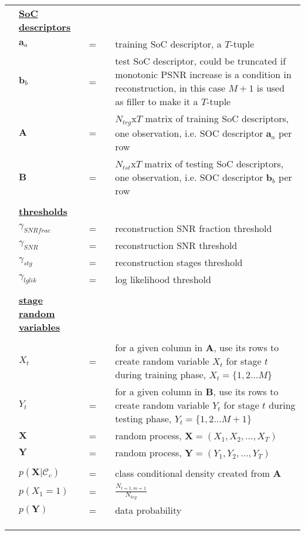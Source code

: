 \documentclass{article}
\begin{document}
\begin{longtable}{llllp{3in}}
&\textbf{\underline{SoC descriptors}}&&&																															\\
&$\mathbf{a}_a$  		&=&&  training SoC descriptor, a $T$-tuple 																																	\\
&$\mathbf{b}_b$ 			&=&&  test SoC descriptor, could be truncated if monotonic PSNR increase is a condition in reconstruction, in this case $M+1$ is used as filler to make it a $T$-tuple	\\
&$\mathbf{A}$  			&=&&  $N_{trg}$x$T$ matrix of training SoC descriptors, one observation, i.e. SOC descriptor $\mathbf{a}_a$ per row 													\\
&$\mathbf{B}$  			&=&&  $N_{tst}$x$T$ matrix of testing SoC descriptors, one observation, i.e. SOC descriptor $\mathbf{b}_b$ per row 													\\ \\

&\textbf{\underline{thresholds}}&&&																															\\
&$\gamma_{SNRfrac}$  		&=&&  reconstruction SNR fraction threshold 																																	\\
&$\gamma_{SNR}$  		&=&&  reconstruction SNR threshold 																																	\\
&$\gamma_{stg}$  		&=&&  reconstruction stages threshold 																																	\\
&$\gamma_{lglik}$  		&=&&  log likelihood threshold 																																	\\ \\

&\textbf{\underline{stage random variables}}&&&\\																															\\
&$X_t$ 					&=&& for a given column in $\mathbf{A}$, use its rows to create random variable $X_t$ for stage $t$ during training phase, $X_t = \{1,2 \ldots M \}$ 					\\
&$Y_t$ 					&=&& for a given column in $\mathbf{B}$, use its rows to create random variable $Y_t$ for stage $t$ during testing phase, $Y_t = \{1,2 \ldots M+1 \}$ 				\\
&$\mathbf{X}$  			&=&& random process, $\mathbf{X} = (X_1, X_2, \ldots, X_T)$																												\\
&$\mathbf{Y}$  			&=&& random process, $\mathbf{Y} = (Y_1, Y_2, \ldots, Y_T)$																												\\ \\
&$p(\mathbf{X}|\mathcal{C}_c)$ 
							&=&& class conditional density created from $\mathbf{A}$ 																													\\ 
&$p(X_1=1)$  				&=&& $\frac{N_{t=1, m=1}}{N_{trg}}$\\
&$p(\mathbf{Y})$ 		&=&& data probability																																							\\ \\ \\ \\



\end{longtable}
\end{document}
